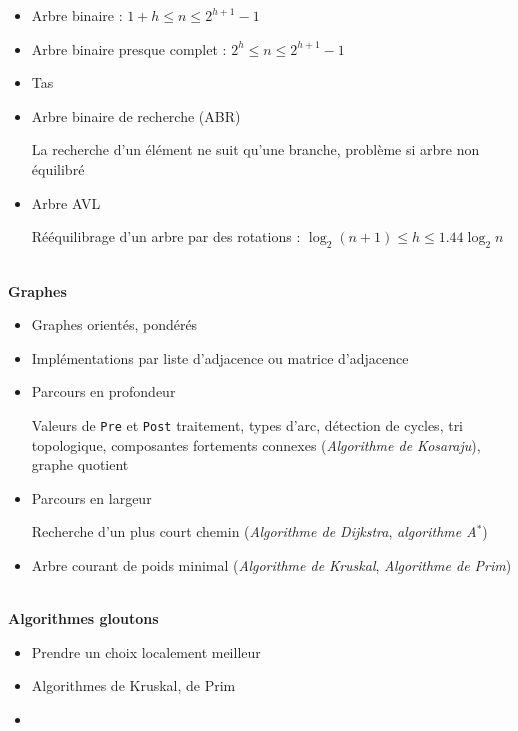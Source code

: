 \documentclass[10pt,a4paper]{article}
\newcommand{\cat}[1]{\noindent \textbf{\Large #1}}
\begin{document}
%
\begin{itemize}[noitemsep]
	\item Arbre binaire : \(  1+h \leq n \leq 2^{h+1}-1  \)
	\item Arbre binaire presque complet : %
		\(  2^h \leq n \leq 2^{h+1}-1  \)
	\item Tas
	\item Arbre binaire de recherche (ABR)
	
		La recherche d'un élément ne suit qu'une branche, problème si arbre non équilibré
	\item Arbre AVL
	
		Rééquilibrage d'un arbre par des rotations :
		\(  \log _2(n+1) \leq h \leq 1.44\log _2 n  \)
	
\end{itemize}
%
~ \\


\cat{Graphes}

%
\begin{itemize}[noitemsep]
	\item Graphes orientés, pondérés
	\item Implémentations par liste d'adjacence ou matrice d'adjacence
	\item Parcours en profondeur
	
		Valeurs de \texttt{Pre} et \texttt{Post} traitement, types d'arc, détection de cycles, tri topologique, composantes fortements connexes (\emph{Algorithme de Kosaraju}), graphe quotient
	\item Parcours en largeur
	
		Recherche d'un plus court chemin (\emph{Algorithme de Dijkstra}, \emph{algorithme A\(^*\)})
	\item Arbre courant de poids minimal (\emph{Algorithme de Kruskal}, \emph{Algorithme de Prim})
\end{itemize}
%
~ \\


\cat{Algorithmes gloutons}

\begin{itemize}[noitemsep]
	\item Prendre un choix localement meilleur
	\item Algorithmes de Kruskal, de Prim
	\item 
\end{itemize}
\end{document}
